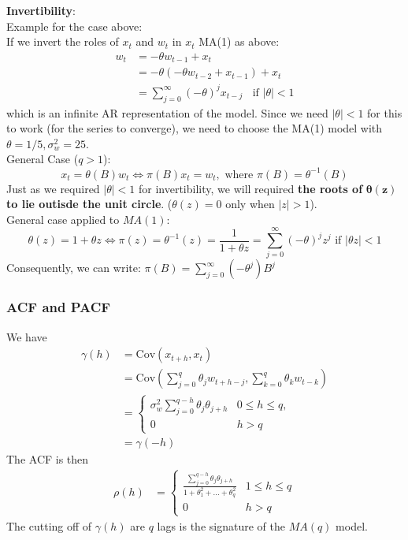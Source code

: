 \documentclass[11pt]{article}
\newcommand{\noi}{\noindent}
\begin{document}
\noi \textbf{Invertibility}: \\
\noi Example for the case above: \\
\noi If we invert the roles of $x_t$ and $w_t$ in $x_t$ MA(1) as above:
\begin{align*}
    w_t &= -\theta w_{t-1} + x_t \\
    &= -\theta(-\theta w_{t-2} + x_{t-1}) + x_t \\
    &= \sum_{j=0}^{\infty} (-\theta)^jx_{t-j} \; \; \text{ if } |\theta| < 1
\end{align*}
\noi which is an infinite AR representation of the model. Since we need $|\theta| < 1$ for this to work (for the series to converge), we need to choose the MA(1) model with $\theta=1/5, \sigma_w^2=25$. \\

\noi General Case ($q>1$): \\
$$x_t = \theta(B)w_t \Leftrightarrow \pi(B)x_t = w_t, \text{ where } \pi(B) = \theta^{-1}(B)$$
\noi Just as we required $|\theta| < 1$ for invertibility, we will required \textbf{the roots of} $\boldsymbol{\theta(z)}$ \textbf{ to lie outisde the unit circle}. ($\theta(z) = 0$ only when $|z|>1$). \\

\noi General case applied to $MA(1)$:
$$\theta(z) = 1 + \theta z \Leftrightarrow \pi(z) = \theta^{-1}(z) = \frac{1}{1 + \theta z} = \sum_{j=0}^{\infty}{(-\theta)^j z^j} \text{ if } |\theta z| < 1$$
Consequently, we can write: $\pi(B) = \sum_{j=0}^{\infty}{(-\theta^j)B^j}$

\subsubsection{ACF and PACF}
\noi We have
\begin{align*}
    \gamma(h) &= \text{Cov}(x_{t+h}, x_t) \\
    &= \text{Cov}(\sum_{j=0}^{q}{\theta_jw_{t+h-j}}, \sum_{k=0}^{q}{\theta_k w_{t-k}}) \\
    &= \begin{cases}
        \sigma_w^2\sum_{j=0}^{q-h}{\theta_j \theta_{j+h}} & 0 \leq h \leq q, \\
        0 & h > q
    \end{cases} \\
    &= \gamma(-h)
\end{align*}
\noi The ACF is then
\begin{align*}
    \rho(h) &= \begin{cases}
        \frac{\sum_{j=0}^{q-h}{\theta_j \theta_{j+h}}}{1 + \theta_1^2 + ... + \theta_q^2} & 1 \leq h \leq q \\
        0 & h > q
    \end{cases}
\end{align*}
\noi The cutting off of $\gamma(h)$ are $q$ lags is the signature of the $MA(q)$ model. \\
\end{document}

